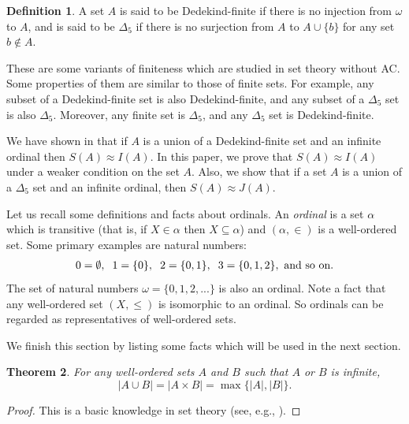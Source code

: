 \documentclass[a4paper,12pt,review]{article} %
\newtheorem{thm}{Theorem}[section]
\theoremstyle{definition}
\newtheorem{defn}[thm]{Definition}
\numberwithin{equation}{section}
\begin{document}
\begin{defn}
A set $A$ is said to be Dedekind-finite if there is no injection from $\omega$ to $A$, and is said to be $\Delta_{5}$ if there is no surjection from $A$ to $A\cup\{b\}$ for any set $b\not\in A$. 
\end{defn}

These are some variants of finiteness which are studied in set theory without AC. Some properties of them are similar to those of finite sets. For example, any subset of a Dedekind-finite set is also Dedekind-finite, and any subset of a $\Delta_{5}$ set is also $\Delta_{5}$. Moreover, any finite set is $\Delta_{5}$, and any $\Delta_{5}$ set is Dedekind-finite.

We have shown in \cite{my} that if $A$ is a union of a Dedekind-finite set and an infinite ordinal then $S(A)\approx I(A)$. In this paper, we prove that $S(A)\approx I(A)$ under a weaker condition on the set $A$. Also, we show that if a set $A$ is a union of a $\Delta_{5}$ set and an infinite ordinal, then $S(A)\approx J(A)$.

Let us recall some definitions and facts about ordinals. An \emph{ordinal} is a set $\alpha$ which is transitive (that is, if $X\in\alpha$ then $X\subseteq\alpha$) and $(\alpha,\in)$ is a well-ordered set. Some primary examples are natural numbers:
\begin{align*}0=\emptyset,\hspace{0.2cm} 1=\{0\},\hspace{0.2cm} 2=\{0,1\},\hspace{0.2cm} 3=\{0,1,2\},\text{ and so on}.\end{align*} The set of natural numbers $\omega=\{0,1,2,...\}$ is also an ordinal. Note a fact that any well-ordered set $(X,\leq)$ is isomorphic to an ordinal. So ordinals can be regarded as representatives of well-ordered sets.

We finish this section by listing some facts which will be used in the next section.

\begin{thm}
For any well-ordered sets $A$ and $B$ such that $A$ or $B$ is infinite, 
\begin{equation*}
|A \cup B| = |A \times B| = \max\{|A|,|B|\}.
\end{equation*}
\end{thm}

\begin{proof}
This is a basic knowledge in set theory (see, e.g., \cite{E}).
\end{proof}
\end{document}
